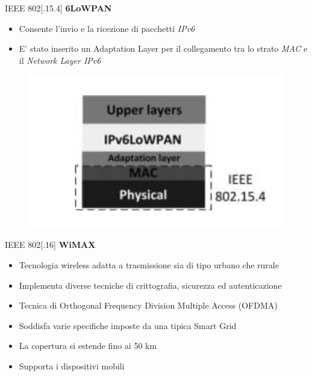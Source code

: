 \begin{frame}{IEEE 802[.15.4]}
	\textbf{6LoWPAN}
	\begin{itemize}
		\item Consente l'invio e la ricezione di pacchetti \textit{IPv6}
		\item E' stato inserito un Adaptation Layer per il collegamento tra lo strato \textit{MAC} e il \textit{Network Layer IPv6}
	\end{itemize}
	\begin{figure}[h]
		\includegraphics[scale=0.3,cfbox=blue_slides 1pt 0pt]{imgs/6pan.png}
	\end{figure}
\end{frame}

\begin{frame}{IEEE 802[.16]}
	\textbf{WiMAX}
	\begin{itemize}[<+- | alert@+>]
		\item Tecnologia wireless adatta a trasmissione sia di tipo urbano che rurale
		\item Implementa diverse tecniche di crittografia, sicurezza ed autenticazione
		\item Tecnica di Orthogonal Frequency Division Multiple Access (OFDMA)
		\item Soddisfa varie specifiche imposte da una tipica Smart Grid
		\item La copertura si estende fino ai 50 km
		\item Supporta i dispositivi mobili
	\end{itemize}
\end{frame}

